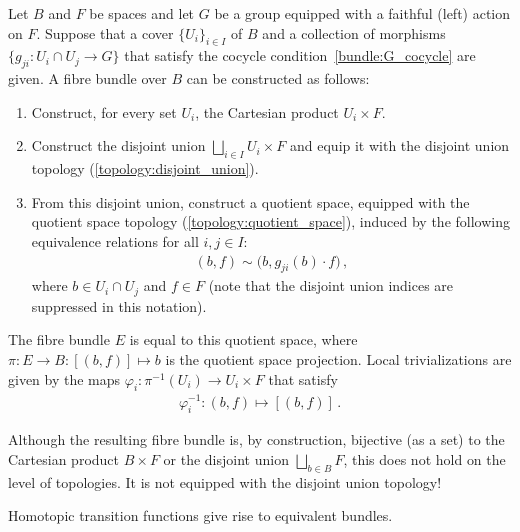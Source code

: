     \begin{construct}\label{bundle:fibre_bundle_construction_theorem}
        Let $B$ and $F$ be spaces and let $G$ be a group equipped with a faithful (left) action on $F$. Suppose that a cover $\{U_i\}_{i\in I}$ of $B$ and a collection of morphisms $\{g_{ji}:U_i\cap U_j\rightarrow G\}$ that satisfy the cocycle condition~\eqref{bundle:G_cocycle} are given. A fibre bundle over $B$ can be constructed as follows:
        \begin{enumerate}
            \item Construct, for every set $U_i$, the Cartesian product $U_i\times F$.
            \item Construct the disjoint union $\bigsqcup_{i\in I}U_i\times F$ and equip it with the disjoint union topology (\cref{topology:disjoint_union}).
            \item From this disjoint union, construct a quotient space, equipped with the quotient space topology (\cref{topology:quotient_space}), induced by the following equivalence relations for all $i,j\in I$:
                \begin{gather}
                    (b,f)\sim\bigl(b,g_{ji}(b)\cdot f\bigr)\,,
                \end{gather}
                where $b\in U_i\cap U_j$ and $f\in F$ (note that the disjoint union indices are suppressed in this notation).
        \end{enumerate}
        The fibre bundle $E$ is equal to this quotient space, where $\pi:E\rightarrow B:[(b,f)]\mapsto b$ is the quotient space projection. Local trivializations are given by the maps $\varphi_i:\pi^{-1}(U_i)\rightarrow U_i\times F$ that satisfy
        \begin{gather}
            \varphi_i^{-1}:(b,f)\mapsto[(b,f)]\,.
        \end{gather}
    \end{construct}
    \begin{remark}[Topology]
        Although the resulting fibre bundle is, by construction, bijective (as a set) to the Cartesian product $B\times F$ or the disjoint union $\bigsqcup_{b\in B}F$, this does not hold on the level of topologies. It is not equipped with the disjoint union topology!
    \end{remark}

    \begin{property}
        Homotopic transition functions give rise to equivalent bundles.
    \end{property}


